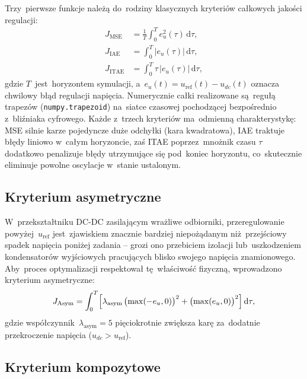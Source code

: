Trzy~pierwsze funkcje należą do~rodziny klasycznych kryteriów całkowych jakości regulacji:
\begin{equation}
    \begin{aligned}
        J_{\mathrm{MSE}}  &= \frac{1}{T}\int_0^{T} e_u^{2}(\tau)\,\mathrm{d}\tau, \\
        J_{\mathrm{IAE}}  &= \int_0^{T} \lvert e_u(\tau)\rvert\,\mathrm{d}\tau, \\
        J_{\mathrm{ITAE}} &= \int_0^{T} \tau\,\lvert e_u(\tau)\rvert\,\mathrm{d}\tau,
    \end{aligned}
    \label{eq:cost-integral}
\end{equation}
gdzie $T$~jest~horyzontem symulacji, a~$e_u(t) = u_{\mathrm{ref}}(t) - u_{dc}(t)$ oznacza chwilowy błąd regulacji napięcia. Numerycznie całki realizowane są~regułą trapezów (\texttt{numpy.trapezoid}) na~siatce czasowej pochodzącej bezpośrednio z~bliźniaka cyfrowego. Każde z~trzech kryteriów ma~odmienną charakterystykę: MSE silnie karze pojedyncze duże odchyłki (kara kwadratowa), IAE traktuje błędy liniowo w~całym horyzoncie, zaś ITAE poprzez~mnożnik czasu $\tau$ dodatkowo penalizuje błędy utrzymujące się pod~koniec horyzontu, co~skutecznie eliminuje powolne oscylacje w~stanie ustalonym.

\subsection{Kryterium asymetryczne}
\label{subsec:cost-asymmetric}

W~przekształtniku DC-DC zasilającym wrażliwe odbiorniki, przeregulowanie powyżej~$u_{\mathrm{ref}}$ jest~zjawiskiem znacznie bardziej niepożądanym niż~przejściowy spadek napięcia poniżej zadania -- grozi ono przebiciem izolacji lub~uszkodzeniem kondensatorów wyjściowych pracujących blisko swojego napięcia znamionowego. Aby~proces optymalizacji respektował tę~właściwość fizyczną, wprowadzono kryterium asymetryczne:
\begin{equation}
    J_{\mathrm{Asym}} = \int_0^{T} \Bigl[\lambda_{\mathrm{asym}}\,\bigl(\max(-e_u,0)\bigr)^{2}
        + \bigl(\max(e_u,0)\bigr)^{2}\Bigr]\,\mathrm{d}\tau,
    \label{eq:cost-asymmetric}
\end{equation}
gdzie współczynnik~$\lambda_{\mathrm{asym}} = 5$ pięciokrotnie zwiększa karę za~dodatnie przekroczenie napięcia ($u_{dc} > u_{\mathrm{ref}}$).

\subsection{Kryterium kompozytowe}
\label{subsec:cost-composite}

